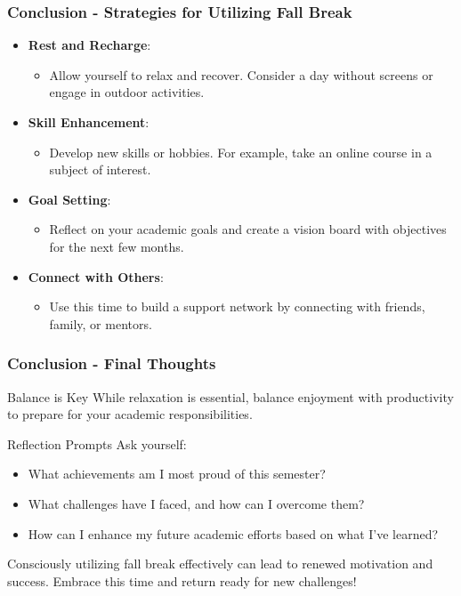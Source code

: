 \documentclass[aspectratio=169]{beamer}
\begin{document}
\begin{frame}[fragile]
    \frametitle{Conclusion - Strategies for Utilizing Fall Break}
    \begin{itemize}
        \item \textbf{Rest and Recharge}:
        \begin{itemize}
            \item Allow yourself to relax and recover. Consider a day without screens or engage in outdoor activities.
        \end{itemize}
        
        \item \textbf{Skill Enhancement}:
        \begin{itemize}
            \item Develop new skills or hobbies. For example, take an online course in a subject of interest.
        \end{itemize}
        
        \item \textbf{Goal Setting}:
        \begin{itemize}
            \item Reflect on your academic goals and create a vision board with objectives for the next few months.
        \end{itemize}
        
        \item \textbf{Connect with Others}:
        \begin{itemize}
            \item Use this time to build a support network by connecting with friends, family, or mentors.
        \end{itemize}
    \end{itemize}
\end{frame}

\begin{frame}[fragile]
    \frametitle{Conclusion - Final Thoughts}
    \begin{block}{Balance is Key}
        While relaxation is essential, balance enjoyment with productivity to prepare for your academic responsibilities.
    \end{block}
    
    \begin{block}{Reflection Prompts}
        Ask yourself:
        \begin{itemize}
            \item What achievements am I most proud of this semester?
            \item What challenges have I faced, and how can I overcome them?
            \item How can I enhance my future academic efforts based on what I've learned?
        \end{itemize}
    \end{block}

    Consciously utilizing fall break effectively can lead to renewed motivation and success. Embrace this time and return ready for new challenges!
\end{frame}
\end{document}

